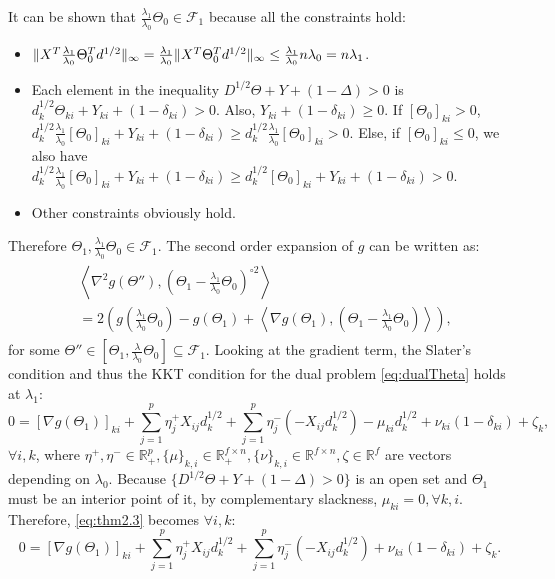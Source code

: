 It can be shown that $\frac{\lambda_1}{\lambda_0}\Theta_{0}\in\mathcal{F}_{1}$ because all the constraints hold:
\begin{itemize}
    \item $\lVert X^T\frac{\lambda_1}{\lambda_0}\Theta_{0}^Td^{1/2}\rVert_\infty=\frac{\lambda_1}{\lambda_0}\lVert X^T\Theta_{0}^Td^{1/2}\rVert_\infty\leq \frac{\lambda_1}{\lambda_0}n\lambda_0=n\lambda_1$.
    \item Each element in the inequality $D^{1/2}\Theta+Y+(1-\Delta)> 0$ is $d_k^{1/2}\Theta_{ki}+Y_{ki}+(1-\delta_{ki})>0$. Also, $Y_{ki}+(1-\delta_{ki})\geq 0$. If $[\Theta_0]_{ki}>0$, $d_k^{1/2}\frac{\lambda_1}{\lambda_0}[\Theta_0]_{ki}+Y_{ki}+(1-\delta_{ki})\geq d_k^{1/2}\frac{\lambda_1}{\lambda_0}[\Theta_0]_{ki}>0.$ Else, if $[\Theta_0]_{ki}\leq0$, we also have $d_k^{1/2}\frac{\lambda_1}{\lambda_0}[\Theta_0]_{ki}+Y_{ki}+(1-\delta_{ki})\geq d_k^{1/2}[\Theta_0]_{ki}+Y_{ki}+(1-\delta_{ki})>0.$
    \item Other constraints obviously hold.
\end{itemize}
Therefore $\Theta_{1},\frac{\lambda_1}{\lambda_0}\Theta_{0}\in \mathcal{F}_{1}$. The second order expansion of $g$ can be written as:
\begin{gather}
\label{eq:thm2.1}
    \begin{aligned}
        &\left\langle\nabla^2g(\Theta''),\left(\Theta_{1}-\frac{\lambda_1}{\lambda_0}\Theta_{0}\right)^{\circ 2}\right\rangle\\&=2\left(g\left(\frac{\lambda_1}{\lambda_0}\Theta_{0}\right)-g(\Theta_{1})+\left\langle\nabla g\left(\Theta_{1}\right),\left(\Theta_{1}-\frac{\lambda_1}{\lambda_0}\Theta_{0}\right)\right\rangle\right),
    \end{aligned}
\end{gather}
 for some $\Theta''\in[\Theta_1,\frac{\lambda}{\lambda_0}\Theta_{0}]\subseteq \mathcal{F}_1$. Looking at the gradient term, the Slater's condition and thus the KKT condition for the dual problem \eqref{eq:dualTheta} holds at $\lambda_1$:
\begin{equation}
    \label{eq:thm2.3}
    0=[\nabla g(\Theta_{1})]_{ki}+\sum_{j=1}^p\eta^+_jX_{ij}d_k^{1/2}+\sum_{j=1}^p\eta^-_j(-X_{ij}d_k^{1/2})-\mu_{ki}d_k^{1/2}+\nu_{ki}(1-\delta_{ki})+\zeta_k,
\end{equation}
$\forall i,k$, where $\eta^+,\eta^-\in\mathbb{R}^p_+,\{\mu\}_{k,i}\in\mathbb{R}^{f\times n}_+,\{\nu\}_{k,i}\in\mathbb{R}^{f\times n},\zeta\in\mathbb{R}^f$ are vectors depending on $\lambda_0$. Because $\{D^{1/2}\Theta+Y+(1-\Delta)>0\}$ is an open set and $\Theta_{1}$ must be an interior point of it, by complementary slackness, $\mu_{ki}=0,\forall k,i$. Therefore, \eqref{eq:thm2.3} becomes $\forall i,k$:
\begin{equation}
    \label{eq:thm2.4}
    0=[\nabla g(\Theta_{1})]_{ki}+\sum_{j=1}^p\eta^+_jX_{ij}d_k^{1/2}+\sum_{j=1}^p\eta^-_j(-X_{ij}d_k^{1/2})+\nu_{ki}(1-\delta_{ki})+\zeta_k.
\end{equation}

